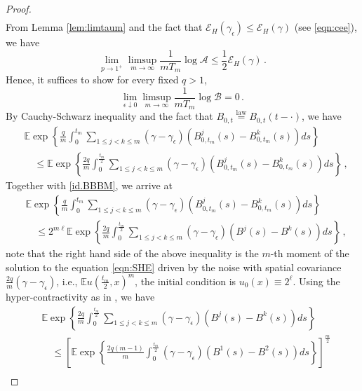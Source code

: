 \documentclass[12pt,reqno]{amsart}
\theoremstyle{remark}
\newcommand{\1}{\mathbf{1}}
\def\EE{\mathbb{E}}
\def\A{\mathcal{A}}
\def\B{\mathcal{B}}
\def\cee{{\mathcal E}}
\begin{document}
\begin{proof}
\begin{align*}
		\end{align*}
		From Lemma \ref{lem:limtaum} and the fact that  $\cee_H(\gamma_\epsilon) \leq \cee_H(\gamma)$ (see \eqref{eqn:cee}), we have
		\begin{equation*}
			\lim_{p\to1^+}\limsup_{m\to\infty}\frac1{mT_m}\log \A\le \frac12\cee_H(\gamma)\,.
		\end{equation*}
		Hence, it suffices to show for every fixed $q>1$,
		\begin{equation}\label{eq: suppose we know}
			\lim_{\epsilon\downarrow0}\limsup_{m\to\infty}\frac1{mT_m}\log\B=0\,.
		\end{equation}
	By  Cauchy-Schwarz inequality and the fact that $B_{0,t} {\stackrel {\text{law}} {=}} B_{0,t}(t-\cdot)$, we have 
	\begin{align*}
	&\EE \exp \left\{ \frac{q}{m} \int_0^{t_m} \sum_{1 \leq j < k \leq m} \left( \gamma - \gamma_{\epsilon} \right) \left( B_{0, t_m}^j(s)- B_{0, t_m}^k(s) \right) ds \right\}\\
	&\quad\leq \EE \exp \left\{ \frac{2q}{m} \int_0^{\frac{t_m}{2}} \sum_{1 \leq j < k \leq m} \left( \gamma - \gamma_{\epsilon} \right) \left( B_{0, t_m}^j(s)- B_{0, t_m}^k(s) \right) ds \right\}\,,
	\end{align*}
	Together with \eqref{id.BBBM}, we arrive at 
	\begin{align*}
	&\EE \exp \left\{ \frac{q}{m} \int_0^{t_m} \sum_{1 \leq j < k \leq m} \left( \gamma - \gamma_{\epsilon} \right) \left( B_{0, t_m}^j(s)- B_{0, t_m}^k(s) \right) ds \right\}\\
	&\quad \leq 2^{m \ell} \EE \exp \left\{ \frac{2q}{m} \int_0^{\frac{t_m}{2}} \sum_{1 \leq j < k \leq m} \left( \gamma - \gamma_{\epsilon} \right) \left( B^j(s)- B^k(s) \right) ds \right\}\,,
		\end{align*}	
	 note that the right hand side of the above inequality is the $m$-th moment of the solution to the equation \eqref{eqn:SHE} driven by the noise with spatial covariance $\frac{2q}{m}\left(\gamma - \gamma_{\epsilon}\right)$, i.e., $\EE u(\frac{t_m}{2}, x)^m$,  the initial condition is $u_0(x) \equiv 2^{\ell}$. Using the hyper-contractivity as in \cites{HLN15,MR3531492}, we have 
	 \begin{align*}
	& \EE \exp \left\{ \frac{2q}{m} \int_0^{\frac{t_m}{2}} \sum_{1 \leq j < k \leq m} \left( \gamma - \gamma_{\epsilon} \right) \left( B^j(s)- B^k(s) \right) ds \right\}\\
	&\quad \leq \left[\EE \exp \left\{ \frac{2q(m-1)}{m} \int_0^{\frac{t_m}{2}}  \left( \gamma - \gamma_{\epsilon} \right) \left( B^1(s)- B^2(s) \right) ds \right\}\right]^{\frac{m}{2}} \\

\end{align*}
\end{proof}
\end{document}
